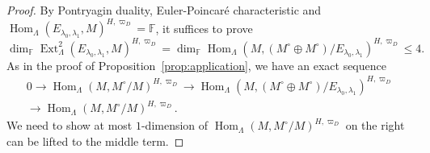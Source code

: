 \documentclass[11pt,a4paper]{article} %
\def\FF{\mathbb{F}}
\def\dim{\operatorname{dim}}
\def\Ext{\operatorname{Ext}} %
\def\Hom{\operatorname{Hom}}
\begin{document}
\begin{proof}
    By Pontryagin duality, Euler-Poincar\'e characteristic and $\Hom_\Lambda(E_{\lambda_0,\lambda_1},M)^{H,\varpi_D}=\FF$, it suffices to prove
    \[
    \dim_\FF\Ext^2_\Lambda(E_{\lambda_0,\lambda_1},M)^{H,\varpi_D}=\dim_\FF\Hom_\Lambda\left(M,(M^\circ\oplus M^\circ)/E_{\lambda_0,\lambda_1}\right)^{H,\varpi_D}\le4.
    \]
    As in the proof of Proposition~\ref{prop:application}, we have an exact sequence
    \[
    \begin{split}
        0\longrightarrow\Hom_\Lambda(M,M^\circ/M)^{H,\varpi_D}\longrightarrow\Hom_\Lambda\left(M,(M^\circ\oplus M^\circ)/E_{\lambda_0,\lambda_1}\right)^{H,\varpi_D}\\
        \longrightarrow\Hom_\Lambda(M,M^\circ/M)^{H,\varpi_D}.
    \end{split}
    \]
    We need to show at most $1$-dimension of $\Hom_\Lambda(M,M^\circ/M)^{H,\varpi_D}$ on the right can be lifted to the middle term.


\end{proof}
\end{document}
